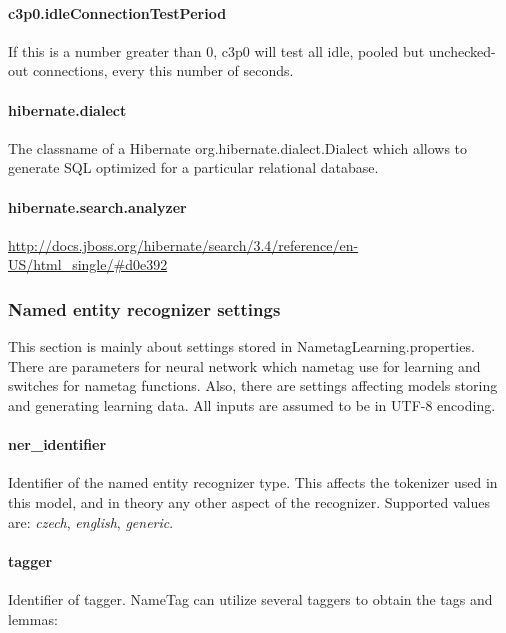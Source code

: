 \paragraph{c3p0.idleConnectionTestPeriod}
If this is a number greater than 0, c3p0 will test all idle, pooled but unchecked-out
connections, every this number of seconds.

\paragraph{hibernate.dialect}
The classname of a Hibernate org.hibernate.dialect.Dialect which allows to generate
SQL optimized for a particular relational database.

\paragraph{hibernate.search.analyzer}
\url{http://docs.jboss.org/hibernate/search/3.4/reference/en-US/html_single/#d0e392}

\subsubsection{Named entity recognizer settings}
\label{sssec:NametagSettings}
This section is mainly about settings stored in NametagLearning.properties. There
are parameters for neural network which nametag use for learning and switches for
nametag functions. Also, there are settings affecting models storing and
generating learning data. All inputs are assumed to be in UTF-8 encoding.

\paragraph{ner\_identifier}
Identifier of the named entity recognizer type. This affects the tokenizer used
in this model, and in theory any other aspect of the recognizer. Supported values
are: \emph{czech}, \emph{english}, \emph{generic}.

\paragraph{tagger}
Identifier of tagger. NameTag can utilize several taggers to obtain the tags and lemmas:

